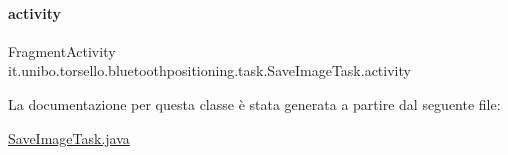 \paragraph{\texorpdfstring{activity}{activity}}
{\footnotesize\ttfamily Fragment\+Activity it.\+unibo.\+torsello.\+bluetoothpositioning.\+task.\+Save\+Image\+Task.\+activity\hspace{0.3cm}{\ttfamily [private]}}



La documentazione per questa classe è stata generata a partire dal seguente file\+:\begin{DoxyCompactItemize}
\item 
\hyperlink{SaveImageTask_8java}{Save\+Image\+Task.\+java}\end{DoxyCompactItemize}

